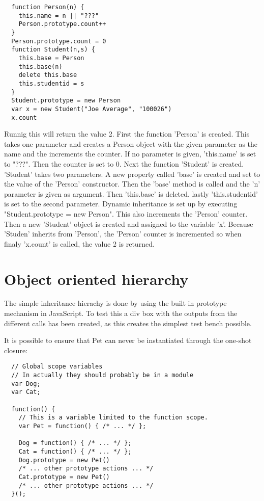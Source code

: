 \documentclass[a4paper,10pt]{article}
\begin{document}
\begin{verbatim}
  function Person(n) {
    this.name = n || "???"
    Person.prototype.count++
  }
  Person.prototype.count = 0
  function Student(n,s) {
    this.base = Person
    this.base(n)
    delete this.base
    this.studentid = s
  }
  Student.prototype = new Person
  var x = new Student("Joe Average", "100026")
  x.count
\end{verbatim}
Runnig this will return the value 2.
First the function 'Person' is created. This takes one parameter and creates a Person object with the given parameter as the name and the increments the counter. If no parameter is given, 'this.name' is set to "???".
Then the counter is set to 0.
Next the function 'Student' is created. 'Student' takes two parameters. A new property called 'base' is created and set to the value of the 'Person' constructor. Then the 'base' method is called and the 'n' parameter is given as argument. Then 'this.base' is deleted. lastly 'this.studentid' is set to the second parameter.
Dynamic inheritance is set up by executing "Student.prototype = new Person". This also increments the 'Person' counter. Then a new 'Student' object is created and assigned to the variable 'x'. Because 'Studen' inherits from 'Person', the 'Person' counter is incremented so when finaly 'x.count' is called, the value 2 is returned.


\section*{Object oriented hierarchy}
The simple inheritance hierachy is done by using the built in
prototype mechanism in JavaScript.  To test this a div box with the
outputs from the different calls has been created, as this creates the
simplest test bench possible.

It is possible to ensure that Pet can never be instantiated through
the one-shot closure:

\begin{verbatim}
  // Global scope variables
  // In actually they should probably be in a module
  var Dog;
  var Cat;

  function() {
    // This is a variable limited to the function scope.
    var Pet = function() { /* ... */ };

    Dog = function() { /* ... */ };
    Cat = function() { /* ... */ };
    Dog.prototype = new Pet()
    /* ... other prototype actions ... */
    Cat.prototype = new Pet()
    /* ... other prototype actions ... */
  }();
\end{verbatim}
\end{document}
